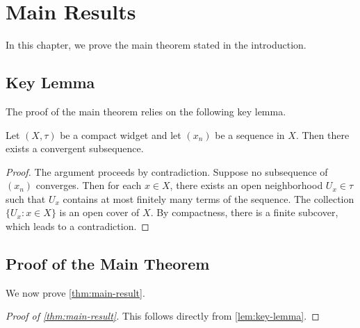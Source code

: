 
\chapter{Main Results}\label{cha:main-results}

In this chapter, we prove the main theorem stated in the introduction.

\section{Key Lemma}\label{sec:key-lemma}

The proof of the main theorem relies on the following key lemma.

\begin{lemma}\label{lem:key-lemma}
  Let $(X, \tau)$ be a compact widget and let $(x_n)$ be a sequence in $X$.
  Then there exists a convergent subsequence.
\end{lemma}

\begin{proof}
  The argument proceeds by contradiction.
  Suppose no subsequence of $(x_n)$ converges.
  Then for each $x \in X$, there exists an open neighborhood $U_x \in \tau$
  such that $U_x$ contains at most finitely many terms of the sequence.
  The collection $\{U_x : x \in X\}$ is an open cover of $X$.
  By compactness, there is a finite subcover, which leads to a contradiction.
\end{proof}

\section{Proof of the Main Theorem}\label{sec:proof-main-theorem}

We now prove \cref{thm:main-result}.

\begin{proof}[Proof of \cref{thm:main-result}]
  This follows directly from \cref{lem:key-lemma}.
\end{proof}

